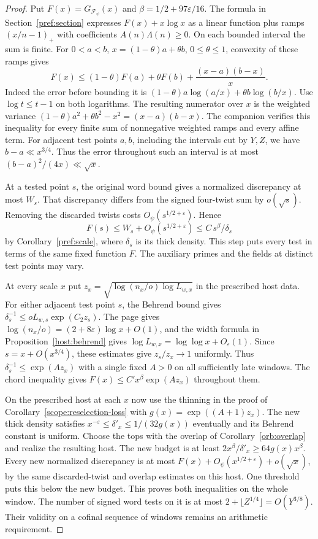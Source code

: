 \begin{proof}
Put \(F(x)=G_{\mathcal F_\psi}(x)\) and
\(\beta=1/2+97\varepsilon/16\). The formula in
Section~\ref{pref:section} expresses \(F(x)+x\log x\) as a linear
function plus ramps \((x/n-1)_+\) with coefficients
\(A(n)\Lambda(n)\ge0\). On each bounded interval the sum is finite.
For \(0<a<b\), \(x=(1-\theta)a+\theta b\), \(0\le\theta\le1\),
convexity of these ramps gives
\[
  F(x)\le (1-\theta)F(a)+\theta F(b)+\frac{(x-a)(b-x)}{x}.
\]
Indeed the error before bounding it is
\((1-\theta)a\log(a/x)+\theta b\log(b/x)\). Use \(\log t\le t-1\)
on both logarithms. The resulting numerator over \(x\) is the
weighted variance \((1-\theta)a^2+\theta b^2-x^2=(x-a)(b-x)\).
The companion  verifies this
inequality for every finite sum of nonnegative weighted ramps and
every affine term.
For adjacent test points \(a,b\), including the intervals cut by
\(Y,Z\), we have \(b-a\ll x^{3/4}\). Thus the error throughout
such an interval is at most \((b-a)^2/(4x)\ll\sqrt x\).

At a tested point \(s\), the original word bound gives a normalized
discrepancy at most \(W_s\). That discrepancy differs from the signed
four-twist sum by \(o(\sqrt{s})\). Removing the discarded twists costs
\(O_\psi(s^{1/2+\varepsilon})\). Hence
\[
    F(s)\le W_s+O_\psi(s^{1/2+\varepsilon})
         \le C\,s^\beta/\delta_s
\]
by Corollary~\ref{pref:scale}, where \(\delta_s\) is its thick density.
This step puts every test in terms of the same fixed function \(F\).
The auxiliary primes and the fields at distinct test points may vary.

At every scale \(x\) put
\(z_x=\sqrt{\log(n_x/o)\log L_{w,x}}\) in the prescribed host data.
For either adjacent test point \(s\), the Behrend bound gives
\(\delta_s^{-1}\le oL_{w,s}\exp(C_2z_s)\). The page gives
\(\log(n_x/o)=(2+8\varepsilon)\log x+O(1)\), and the width formula
in Proposition~\ref{host:behrend} gives
\(\log L_{w,x}=\log\log x+O_\varepsilon(1)\). Since
\(s=x+O(x^{3/4})\), these estimates give \(z_s/z_x\to1\) uniformly.
Thus \(\delta_s^{-1}\le\exp(Az_x)\) with a single fixed \(A>0\)
on all sufficiently late windows. The chord inequality gives
\(F(x)\le C' x^\beta\exp(Az_x)\) throughout them.

On the prescribed host at each \(x\) now use the thinning in the proof
of Corollary~\ref{scope:reselection-loss} with
\(g(x)=\exp((A+1)z_x)\). The new thick density satisfies
\(x^{-\varepsilon}\le\delta'_x\le1/(32g(x))\) eventually and its
Behrend constant is uniform. Choose the tops with the overlap of
Corollary~\ref{orb:overlap} and realize the resulting host. The
new budget is at least \(2x^\beta/\delta'_x\ge64g(x)x^\beta\).
Every new normalized discrepancy is at most
\(F(x)+O_\psi(x^{1/2+\varepsilon})+o(\sqrt{x})\), by the same
discarded-twist and overlap estimates on this host. One threshold
puts this below the new budget. This proves both inequalities on
the whole window. The number of signed word tests on it is at most
\(2+\lfloor Z^{1/4}\rfloor=O(Y^{3/8})\). Their validity on a
cofinal sequence of windows remains an arithmetic requirement.
\end{proof}

